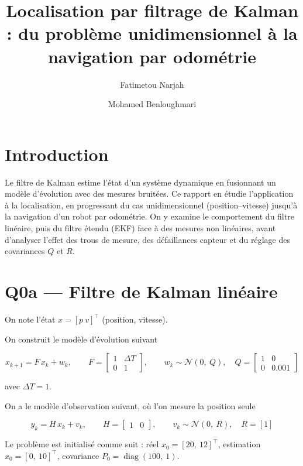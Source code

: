\documentclass[11pt]{article}
\title{Localisation par filtrage de Kalman : du problème unidimensionnel à la navigation par odométrie}
\author{
  Fatimetou Narjah \and Mohamed Benloughmari
}
\date{}
\theoremstyle{remark}
\theoremstyle{definition}
\begin{document}
\maketitle

\section*{Introduction}

Le filtre de Kalman estime l'état d'un système dynamique en fusionnant un modèle d'évolution
avec des mesures bruitées. Ce rapport en étudie l'application à la localisation, en
progressant du cas unidimensionnel (position--vitesse) jusqu'à la navigation d'un robot par
odométrie. On y examine le comportement du filtre linéaire, puis du filtre étendu (EKF) face à
des mesures non linéaires, avant d'analyser l'effet des trous de mesure, des défaillances
capteur et du réglage des covariances $Q$ et $R$.

\section{Q0a --- Filtre de Kalman linéaire}

On note l'état $x = [p\ v]^\top$ (position, vitesse).

On construit le modèle d'évolution suivant

\begin{equation}
x_{k+1} = F\,x_k + w_k,
\qquad
F = \begin{bmatrix} 1 & \Delta T \\ 0 & 1 \end{bmatrix},
\qquad
w_k \sim \mathcal{N}\!\left(0,\ Q\right),
\quad
Q = \begin{bmatrix} 1 & 0 \\ 0 & 0.001 \end{bmatrix}
\end{equation}

avec $\Delta T = 1$.

On a le modèle d'observation suivant, où l'on mesure la position seule

\begin{equation}
y_k = H\,x_k + v_k,
\qquad
H = \begin{bmatrix} 1 & 0 \end{bmatrix},
\qquad
v_k \sim \mathcal{N}(0,\ R),\quad R = [1]
\end{equation}

Le problème est initialisé comme suit : réel $x_0 = [20,\ 12]^\top$, estimation
$\hat{x}_0 = [0,\ 10]^\top$, covariance $P_0 = \operatorname{diag}(100,\ 1)$.
\end{document}
